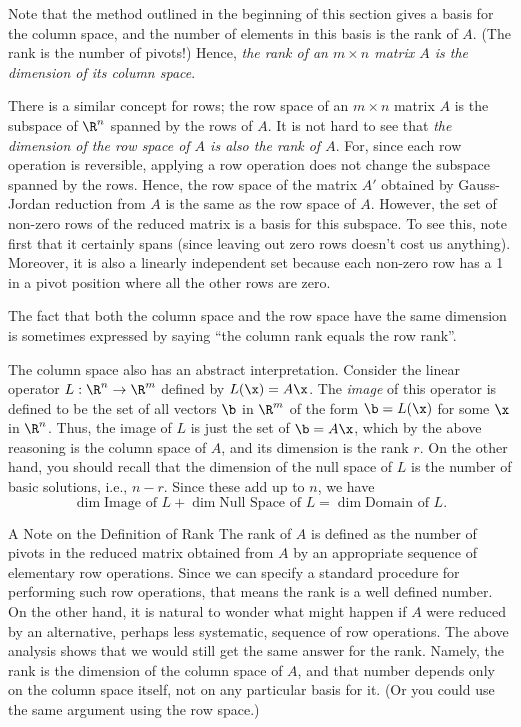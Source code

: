 Note that the method outlined in the beginning of this section
gives a basis for the column space, and the number of elements
in this basis is the rank of $A$.  (The rank is the number of
pivots!)  Hence, {\it the rank of an $m\times n$ matrix $A$ is
the dimension of its column space}.

There is a similar concept for rows;  the row space of an
$m\times n$ matrix $A$ is the subspace of $\R^n$ spanned by
the rows of $A$.   It is not hard to see that {\it the dimension
of the row space of $A$ is also the rank of $A$}.  For,
since each row operation is reversible, applying a row operation
does not change the subspace spanned by the rows.  Hence, the
row space of the matrix $A'$ obtained by Gauss-Jordan reduction
from $A$ is the same as the row space of $A$.   However, the
 set of non-zero rows of the reduced matrix is a basis for this subspace.
To see this, note first that it certainly spans (since leaving
out zero rows doesn't cost us anything).   Moreover, it is also
a linearly independent set because each non-zero row has a 1 in
a pivot position where all the other rows are zero.
%

The fact that both the column space and the row space have the
same dimension is sometimes expressed by saying
``the column rank equals the row rank''.

The column space also has an abstract interpretation.
Consider the linear operator $L:\R^n \to \R^m$ defined by
$L(\x) = A\x$.    The {\it image\/} of this operator is defined
to be the set of all vectors $\b$ in $\R^m$ of the form
$\b = L(\x)$ for some $\x$ in $\R^n$.  Thus, the image of $L$
is just the set of $\b = A\x$, which by the above reasoning is
the column space of $A$, and its dimension is the rank $r$.   
On the other hand, you should recall that the dimension of
the null space of $L$ is the number of basic solutions, i.e.,
$n - r$.    Since these add up to $n$, we have
$$
\dim \text{Image of }L + \dim \text{Null Space of }L = \dim
\text{Domain of }L.
$$

\medskip
\subhead A Note on the Definition of Rank \endsubhead
The rank of $A$ is defined as the number of pivots
in the reduced matrix obtained from $A$ by
an appropriate sequence of elementary row operations.   Since we
can specify a standard procedure for performing such row operations,
that means the rank is a well defined number.   On the other hand,
it is natural to wonder what might happen if $A$ were reduced by
an alternative, perhaps less systematic, sequence of row operations.
The above analysis shows that we would still get the same answer
for the rank.  Namely, the rank is the dimension of the column
space  of $A$, and that number depends only on
 the column space itself, not on any particular basis for it.
(Or you could use the same argument using the row space.)

